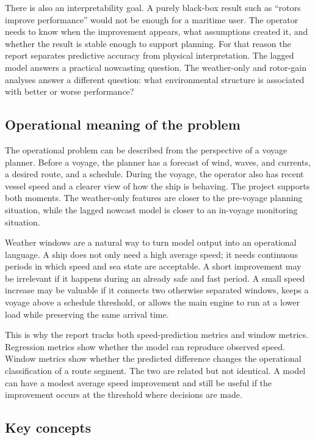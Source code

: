 \documentclass[10pt,a4paper]{article}
\begin{document}
There is also an interpretability goal. A purely black-box result such as
``rotors improve performance'' would not be enough for a maritime user. The
operator needs to know when the improvement appears, what assumptions created
it, and whether the result is stable enough to support planning. For that
reason the report separates predictive accuracy from physical interpretation.
The lagged model answers a practical nowcasting question. The weather-only and
rotor-gain analyses answer a different question: what environmental structure
is associated with better or worse performance?

\subsection{Operational meaning of the problem}

The operational problem can be described from the perspective of a voyage
planner. Before a voyage, the planner has a forecast of wind, waves, and
currents, a desired route, and a schedule. During the voyage, the operator also
has recent vessel speed and a clearer view of how the ship is behaving. The
project supports both moments. The weather-only features are closer to the
pre-voyage planning situation, while the lagged nowcast model is closer to an
in-voyage monitoring situation.

Weather windows are a natural way to turn model output into an operational
language. A ship does not only need a high average speed; it needs continuous
periods in which speed and sea state are acceptable. A short improvement may be
irrelevant if it happens during an already safe and fast period. A small speed
increase may be valuable if it connects two otherwise separated windows, keeps a
voyage above a schedule threshold, or allows the main engine to run at a lower
load while preserving the same arrival time.

This is why the report tracks both speed-prediction metrics and window metrics.
Regression metrics show whether the model can reproduce observed speed.
Window metrics show whether the predicted difference changes the operational
classification of a route segment. The two are related but not identical. A
model can have a modest average speed improvement and still be useful if the
improvement occurs at the threshold where decisions are made.

\subsection{Key concepts}
\end{document}
